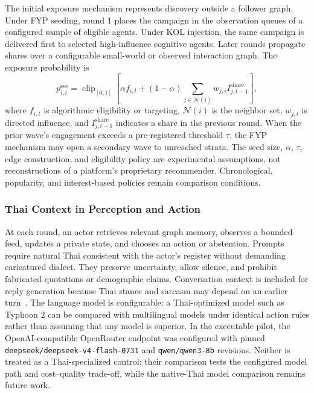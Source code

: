 \documentclass[conference]{IEEEtran}
\begin{document}
The initial exposure mechanism represents discovery outside a follower graph.
Under FYP seeding, round 1 places the campaign in the observation queues of a
configured sample of eligible agents. Under KOL injection, the same campaign is
delivered first to selected high-influence cognitive agents. Later rounds
propagate shares over a configurable small-world or observed interaction graph.
The exposure probability is
\begin{equation}
    p^{\mathrm{see}}_{i,t}=\operatorname{clip}_{[0,1]}\!\left[
    \alpha f_{i,t}+(1-\alpha)
    \sum_{j\in\mathcal{N}(i)}w_{j,i}
    I^{\mathrm{share}}_{j,t-1}\right],
    \label{eq:algorithmic-exposure}
\end{equation}
where $f_{i,t}$ is algorithmic eligibility or targeting, $\mathcal{N}(i)$ is
the neighbor set, $w_{j,i}$ is directed influence, and
$I^{\mathrm{share}}_{j,t-1}$ indicates a share in the previous round. When the
prior wave's engagement exceeds a pre-registered threshold $\tau$, the FYP mechanism may
open a secondary wave to unreached strata. The seed size, $\alpha$, $\tau$,
edge construction, and eligibility policy are experimental assumptions, not
reconstructions of a platform's proprietary recommender. Chronological,
popularity, and interest-based policies remain comparison conditions.

\subsubsection{Thai Context in Perception and Action}

At each round, an actor retrieves relevant graph memory, observes a bounded
feed, updates a private state, and chooses an action or abstention. Prompts
require natural Thai consistent with the actor's register without demanding
caricatured dialect. They preserve uncertainty, allow silence, and prohibit
fabricated quotations or demographic claims. Conversation context is included
for reply generation because Thai stance and sarcasm may depend on an earlier
turn~\cite{hazarika2018cascade}. The language model is configurable: a
Thai-optimized model such as Typhoon 2 can be compared with multilingual
models under identical action rules rather than assuming that any model is
superior. In the executable pilot, the OpenAI-compatible OpenRouter endpoint
was configured with pinned \texttt{deepseek/deepseek-v4-flash-0731} and
\texttt{qwen/qwen3-8b} revisions. Neither is treated as a Thai-specialized
control; their comparison tests the configured model path and cost--quality
trade-off, while the native-Thai model comparison remains future work.
\end{document}
